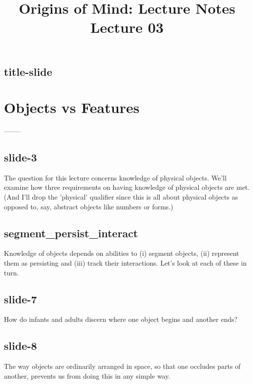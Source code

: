\documentclass[12pt,\papersize]{extarticle}
\begin{document}
\setlength\footnotesep{1em}






\title {Origins of Mind: Lecture Notes \\ Lecture 03}
 
\maketitle
 
 
\subsection{title-slide}
 
\section{Objects vs Features}
--------
 
 
\subsection{slide-3}
The question for this lecture concerns knowledge of physical objects.
We'll examine how three requirements on having knowledge of physical objects are met.
(And I'll drop the 'physical' qualifier since this is all about physical objects as opposed to, say, abstract objects like numbers or forms.)
 
 
\subsection{segment\_persist\_interact}
Knowledge of objects depends on abilities to (i) segment objects, (ii) represent them as persisting and (iii) track their interactions.
Let's look at each of these in turn.
 
 
\subsection{slide-7}
How do infants and adults discern where one object begins and another ends?
 
 
\subsection{slide-8}
The way objects are ordinarily arranged in space, so that one occludes parts of another, prevents us from doing this in any simple way.
 
\end{document}
